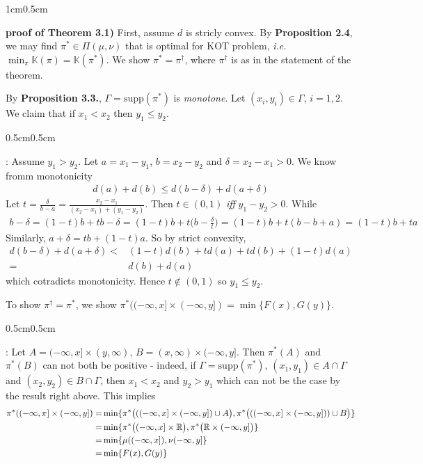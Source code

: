 \documentclass[12pt,a4paper]{article}
\newenvironment{proof}
{\begin{changemargin}{1cm}{0.5cm} 
	}%
	{\end{changemargin}
}
\newenvironment{subproof}
{\begin{changemargin}{0.5cm}{0.5cm} 
	}%
	{\end{changemargin}
}
\newenvironment{p}
{\begin{proof} 
	}%
	{\end{proof}
}
\begin{document}
\begin{p}
\textbf{proof of Theorem 3.1)} First, assume $d$ is stricly convex. By \textbf{Proposition 2.4}, we may find $\pi^* \in \Pi(\mu, \nu)$ that is optimal for KOT problem, \textit{i.e.}  $\min_{\pi} \mathbb{K}(\pi) = \mathbb{K}(\pi^{*})$. We show $\pi^* =\pi^{\dagger}$, where $\pi^{\dagger}$ is as in the statement of the theorem.

\quad By \textbf{Proposition 3.3.}, $\Gamma = \text{supp}(\pi^*)$ is \emph{monotone}. Let $(x_i,y_i) \in \Gamma$, $i=1,2$. We claim that if $x_1<x_2$ then $y_1\leq y_2$.
\begin{subproof}
: Assume $y_1 >y_2$. Let $a= x_1 -y_1$, $b=x_2-y_2$ and $\delta = x_2 -x_1>0$. We know fromm monotonicity
\begin{align*}
d(a) + d(b) \leq d(b-\delta) + d(a+ \delta)
\end{align*}
Let $t =\frac{\delta}{b-a} = \frac{x_2 -x_1}{(x_2-x_1)+(y_1-y_2)}$. Then $t\in (0,1)$ \emph{iff} $y_1-y_2 >0$. While
\begin{align*}
b-\delta = (1-t)b + tb -\delta =(1-t)b +t \Big(b- \frac{\delta}{t}\Big) = (1-t)b + t(b-b+a) = (1-t)b +ta
\end{align*} 
Similarly, $a+ \delta = tb + (1-t)a$. So by strict convexity,
\begin{align*}
d(b-\delta) + d(a+ \delta) <& (1-t) d(b) + td(a) + td(b) + (1-t)d(a) \\
=& d(b) + d(a)
\end{align*}
which cotradicts monotonicity. Hence $t\not \in(0,1)$ so $y_1 \leq y_2$.
\end{subproof}
To show $\pi^{\dagger} = \pi^*$, we show $\pi^*( (-\infty, x] \times (-\infty, y] ) = \min \{ F(x), G(y)\}$.
\begin{subproof}
: Let $A= (-\infty, x] \times (y, \infty)$, $B= (x, \infty) \times (-\infty, y]$. Then $\pi^*(A)$ and $\pi^*(B)$ can not both be positive - indeed, if $\Gamma =\text{supp}(\pi^*)$, $(x_1,y_1)\in A\cap \Gamma$ and $(x_2, y_2) \in B\cap \Gamma$, then $x_1 <x_2$ and $y_2 >y_1$ which can not be the case by the result right above. This implies
\begin{align*}
\pi^*((-\infty, \pi ] \times (-\infty, y]) =& \min \{ \pi^* \big(( (-\infty, x] \times (-\infty, y]) \cup A \big), \pi^* \big(((-\infty, x] \times (-\infty, y]))\cup B \big) \} \\
= &\min \{ \pi^* \big((-\infty, x] \times \mathbb{R} \big), \pi^* \big(\mathbb{R} \times (-\infty,y] \big)\} \\
=&\min \{\mu((-\infty, x]), \nu(-\infty, y]\} \\
=& \min \{ F(x), G(y) \}
\end{align*}
\end{subproof}
\end{p}
\s
\end{document}
